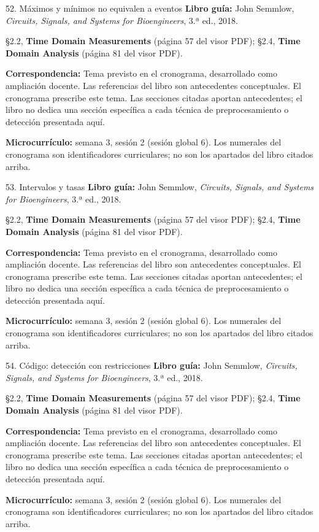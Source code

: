 \documentclass[
  10pt,
  ignorenonframetext,
  aspectratio=169,
  spanish,
]{beamer}
\begin{document}
\begin{frame}{52. Máximos y mínimos no equivalen a eventos}
\label{muxe1ximos-y-muxednimos-no-equivalen-a-eventos}
\textbf{Libro guía:} John Semmlow, \emph{Circuits, Signals, and Systems
for Bioengineers}, 3.ª ed., 2018.

§2.2, \textbf{Time Domain Measurements} (página 57 del visor PDF); §2.4,
\textbf{Time Domain Analysis} (página 81 del visor PDF).

\textbf{Correspondencia:} Tema previsto en el cronograma, desarrollado
como ampliación docente. Las referencias del libro son antecedentes
conceptuales. El cronograma prescribe este tema. Las secciones citadas
aportan antecedentes; el libro no dedica una sección específica a cada
técnica de preprocesamiento o detección presentada aquí.

\textbf{Microcurrículo:} semana 3, sesión 2 (sesión global 6). Los
numerales del cronograma son identificadores curriculares; no son los
apartados del libro citados arriba.
\end{frame}

\begin{frame}{53. Intervalos y tasas}
\label{intervalos-y-tasas}
\textbf{Libro guía:} John Semmlow, \emph{Circuits, Signals, and Systems
for Bioengineers}, 3.ª ed., 2018.

§2.2, \textbf{Time Domain Measurements} (página 57 del visor PDF); §2.4,
\textbf{Time Domain Analysis} (página 81 del visor PDF).

\textbf{Correspondencia:} Tema previsto en el cronograma, desarrollado
como ampliación docente. Las referencias del libro son antecedentes
conceptuales. El cronograma prescribe este tema. Las secciones citadas
aportan antecedentes; el libro no dedica una sección específica a cada
técnica de preprocesamiento o detección presentada aquí.

\textbf{Microcurrículo:} semana 3, sesión 2 (sesión global 6). Los
numerales del cronograma son identificadores curriculares; no son los
apartados del libro citados arriba.
\end{frame}

\begin{frame}{54. Código: detección con restricciones}
\label{cuxf3digo-detecciuxf3n-con-restricciones}
\textbf{Libro guía:} John Semmlow, \emph{Circuits, Signals, and Systems
for Bioengineers}, 3.ª ed., 2018.

§2.2, \textbf{Time Domain Measurements} (página 57 del visor PDF); §2.4,
\textbf{Time Domain Analysis} (página 81 del visor PDF).

\textbf{Correspondencia:} Tema previsto en el cronograma, desarrollado
como ampliación docente. Las referencias del libro son antecedentes
conceptuales. El cronograma prescribe este tema. Las secciones citadas
aportan antecedentes; el libro no dedica una sección específica a cada
técnica de preprocesamiento o detección presentada aquí.

\textbf{Microcurrículo:} semana 3, sesión 2 (sesión global 6). Los
numerales del cronograma son identificadores curriculares; no son los
apartados del libro citados arriba.
\end{frame}
\end{document}
